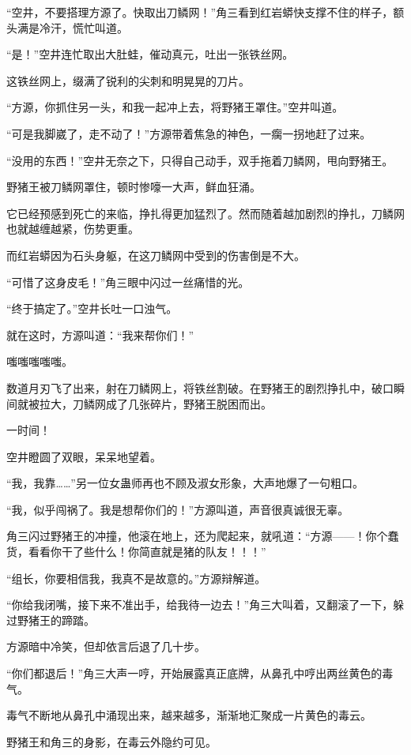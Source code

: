 \begin{this_body}
“空井，不要搭理方源了。快取出刀鳞网！”角三看到红岩蟒快支撑不住的样子，额头满是冷汗，慌忙叫道。

“是！”空井连忙取出大肚蛙，催动真元，吐出一张铁丝网。

这铁丝网上，缀满了锐利的尖刺和明晃晃的刀片。

“方源，你抓住另一头，和我一起冲上去，将野猪王罩住。”空井叫道。

“可是我脚崴了，走不动了！”方源带着焦急的神色，一瘸一拐地赶了过来。

“没用的东西！”空井无奈之下，只得自己动手，双手拖着刀鳞网，甩向野猪王。

野猪王被刀鳞网罩住，顿时惨嚎一大声，鲜血狂涌。

它已经预感到死亡的来临，挣扎得更加猛烈了。然而随着越加剧烈的挣扎，刀鳞网也就越缠越紧，伤势更重。

而红岩蟒因为石头身躯，在这刀鳞网中受到的伤害倒是不大。

“可惜了这身皮毛！”角三眼中闪过一丝痛惜的光。

“终于搞定了。”空井长吐一口浊气。

就在这时，方源叫道：“我来帮你们！”

嗤嗤嗤嗤嗤。

数道月刃飞了出来，射在刀鳞网上，将铁丝割破。在野猪王的剧烈挣扎中，破口瞬间就被拉大，刀鳞网成了几张碎片，野猪王脱困而出。

一时间！

空井瞪圆了双眼，呆呆地望着。

“我，我靠……”另一位女蛊师再也不顾及淑女形象，大声地爆了一句粗口。

“我，似乎闯祸了。我是想帮你们的！”方源叫道，声音很真诚很无辜。

角三闪过野猪王的冲撞，他滚在地上，还为爬起来，就吼道：“方源——！你个蠢货，看看你干了些什么！你简直就是猪的队友！！！”

“组长，你要相信我，我真不是故意的。”方源辩解道。

“你给我闭嘴，接下来不准出手，给我待一边去！”角三大叫着，又翻滚了一下，躲过野猪王的蹄踏。

方源暗中冷笑，但却依言后退了几十步。

“你们都退后！”角三大声一哼，开始展露真正底牌，从鼻孔中哼出两丝黄色的毒气。

毒气不断地从鼻孔中涌现出来，越来越多，渐渐地汇聚成一片黄色的毒云。

野猪王和角三的身影，在毒云外隐约可见。


\end{this_body}
